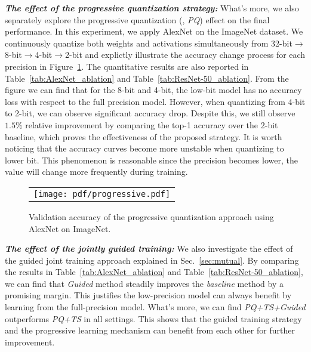 \vspace{1mm}
\noindent\textbf{{\emph{The effect of the progressive quantization strategy:}}} What's more, we also separately explore the progressive quantization (\ie, \emph{PQ}) effect on the final performance.
In this experiment, we apply AlexNet on the ImageNet dataset.
We continuously quantize both weights and activations simultaneously from 32-bit$\to$8-bit$\to$4-bit$\to$2-bit and explictly illustrate the accuracy change process for each precision in Figure~\ref{fig:progressive}. The quantitative results are also reported in Table~\ref{tab:AlexNet_ablation}  and Table~\ref{tab:ResNet-50_ablation}. From the figure we can find that for the 8-bit and 4-bit, the low-bit model has no accuracy loss with respect to the full precision model. However, when quantizing from 4-bit to 2-bit, we can observe significant accuracy drop.
Despite this, we still observe $1.5\%$ relative improvement by comparing the top-1 accuracy over the 2-bit baseline, which proves the effectiveness of the proposed strategy. It is worth noticing that the accuracy curves become more unstable when quantizing to lower bit. This phenomenon is reasonable since the precision becomes lower, the value will change more frequently during training.

\begin{figure}[!htb]
	\centering
	\resizebox{0.9\linewidth}{!}
	{
		\begin{tabular}{c}
			\texttt{[image: pdf/progressive.pdf]}
		\end{tabular}
	}
	\caption{Validation accuracy of the progressive quantization approach using AlexNet on ImageNet.}
	\label{fig:progressive}
\end{figure}

\vspace{1mm}
\noindent\textbf{{\emph{The effect of the jointly guided training:}}}
We also investigate the effect of the guided joint training approach explained in Sec.~\ref{sec:mutual}. By comparing the results in Table~\ref{tab:AlexNet_ablation} and Table~\ref{tab:ResNet-50_ablation}, we can find that \emph{Guided} method steadily improves the \emph{baseline} method by a promising margin. This justifies the low-precision model can always benefit by learning from the full-precision model.
What's more, we can find \emph{PQ+TS+Guided} outperforms \emph{PQ+TS} in all settings. This shows that the guided training strategy and the progressive learning mechanism can benefit from each other for further improvement.

